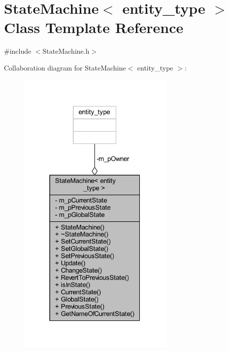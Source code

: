 \section{State\+Machine$<$ entity\+\_\+type $>$ Class Template Reference}
\label{class_state_machine}


{\ttfamily \#include $<$State\+Machine.\+h$>$}



Collaboration diagram for State\+Machine$<$ entity\+\_\+type $>$\+:\nopagebreak
\begin{figure}[H]
\begin{center}
\leavevmode
\includegraphics[width=217pt]{df/d27/class_state_machine__coll__graph}
\end{center}
\end{figure}
